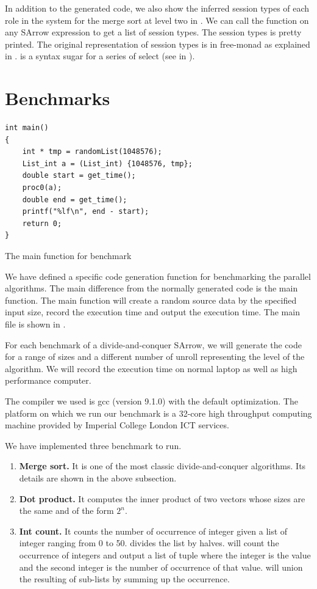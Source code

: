 In addition to the generated code, we also show the inferred session types of each role in the system for the merge sort at level two in . We can call the function  on any SArrow expression to get a list of session types. The session types is pretty printed. The original representation of session types is in free-monad as explained in .  is a syntax sugar for a series of select (see in ).

\section{Benchmarks}
\begin{listing}[ht]
\begin{verbatim}
int main()
{
    int * tmp = randomList(1048576);
    List_int a = (List_int) {1048576, tmp};
    double start = get_time();
    proc0(a);
    double end = get_time();
    printf("%lf\n", end - start);
    return 0;
}
\end{verbatim}
    \caption{The main function for benchmark}
    \label{eval:code:main}
\end{listing}
We have defined a specific code generation function for benchmarking the parallel algorithms. The main difference from the normally generated code is the main function. The main function will create a random source data by the specified input size, record the execution time and output the execution time. The main file is shown in . 

For each benchmark of a divide-and-conquer SArrow, we will generate the code for a range of sizes and a different number of unroll representing the level of the algorithm. We will record the execution time on normal laptop as well as high performance computer.

The compiler we used is gcc (version 9.1.0) with the default optimization. The platform on which we run our benchmark is a 32-core high throughput computing machine provided by Imperial College London ICT services.

We have implemented three benchmark to run.
\begin{enumerate}
    \item \textbf{Merge sort. } It is one of the most classic divide-and-conquer algorithms. Its details are shown in the above subsection.
    \item \textbf{Dot product. } It computes the inner product of two vectors whose sizes are the same and of the form $2^n$.
    \item \textbf{Int count. } It counts the number of occurrence of integer given a list of integer ranging from 0 to 50.  divides the list by halves.  will count the occurrence of integers and output a list of tuple where the integer is the value and the second integer is the number of occurrence of that value.  will union the resulting of sub-lists by summing up the occurrence.
\end{enumerate}

